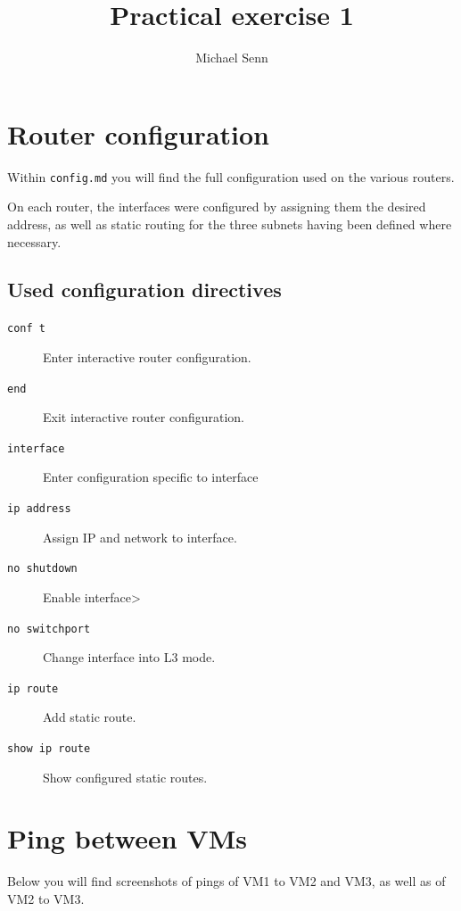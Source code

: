 \documentclass[a4paper]{scrreprt}
\title{Practical exercise 1}
\author{Michael Senn \maillink{michael.senn@students.unibe.ch}}
\date{\printdate}
\begin{document}
\maketitle


\chapter{Router configuration}

Within \texttt{config.md} you will find the full configuration used on the
various routers.

On each router, the interfaces were configured by assigning them the desired
address, as well as static routing for the three subnets having been defined
where necessary.

\section{Used configuration directives}

\begin{description}
  \item[\texttt{conf t}]
    Enter interactive router configuration.
  \item[\texttt{end}]
    Exit interactive router configuration.
  \item[\texttt{interface}]
    Enter configuration specific to interface
  \item[\texttt{ip address}]
    Assign IP and network to interface.
  \item[\texttt{no shutdown}]
    Enable interface>
  \item[\texttt{no switchport}]
    Change interface into L3 mode.
  \item[\texttt{ip route}]
    Add static route.
  \item[\texttt{show ip route}]
    Show configured static routes.
\end{description}

\chapter{Ping between VMs}

Below you will find screenshots of pings of VM1 to VM2 and VM3, as well as of
VM2 to VM3.
\\
\\
\noindent{}
\end{document}
